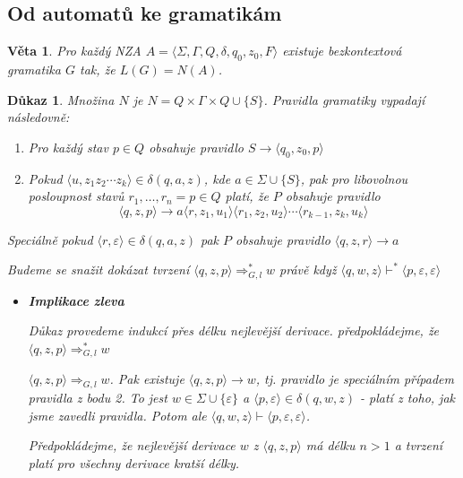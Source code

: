 \documentclass[10pt, a4paper, titlepage]{article}
\theoremstyle{note}
\newtheorem{veta}{Věta}
\newtheorem{dukaz}{Důkaz}
\begin{document}
\subsection{Od automatů ke gramatikám}

\begin{veta}
Pro každý NZA $A=\langle \Sigma,\Gamma,Q,\delta,q_0,z_0,F \rangle$ existuje bezkontextová gramatika $G$ tak, že $L(G)=N(A)$.
\end{veta}

\begin{dukaz}
Množina $N$ je $N=Q \times \Gamma \times Q \cup \lbrace S \rbrace$.
Pravidla gramatiky vypadají následovně:
\begin{enumerate}
\item
Pro každý stav $p \in Q$ obsahuje pravidlo $S \rightarrow \langle q_0,z_0,p \rangle$
\item
Pokud $\langle u,z_1z_2\cdots z_k \rangle \in \delta(q,a,z)$, kde $a \in \Sigma \cup \lbrace S \rbrace$, pak pro
libovolnou posloupnost stavů $r_1,\ldots,r_n=p \in Q$ platí, že $P$ obsahuje pravidlo
$$\langle q,z,p \rangle \rightarrow a\langle r,z_1,u_1 \rangle\langle r_1,z_2,u_2 \rangle \cdots \langle r_{k-1},z_k,u_k \rangle$$
\end{enumerate}

Speciálně pokud $\langle r, \varepsilon \rangle \in \delta(q,a,z)$ pak $P$ obsahuje pravidlo $\langle q,z,r \rangle \rightarrow a$

Budeme se snažit dokázat tvrzení $\langle q,z,p \rangle \Rightarrow_{G,l}^* w$ právě když $\langle q,w,z \rangle \vdash^* \langle p,\varepsilon ,\varepsilon   \rangle$

\begin{itemize}
\item
\textbf{Implikace zleva}

Důkaz provedeme indukcí přes délku nejlevější derivace. předpokládejme, že $\langle q,z,p \rangle \Rightarrow_{G,l}^* w$

$\langle q,z,p \rangle \Rightarrow_{G,l} w$. Pak existuje $\langle q,z,p \rangle \rightarrow w$, tj. pravidlo je speciálním případem pravidla z bodu 2. To jest $w \in \Sigma \cup \lbrace \varepsilon \rbrace$ a $\langle p, \varepsilon \rangle \in \delta (q,w,z)$ - platí z toho, jak jsme zavedli pravidla. Potom ale $\langle q,w,z \rangle \vdash \langle p,\varepsilon,\varepsilon \rangle$.

Předpokládejme, že nejlevější derivace $w$ z $\langle q,z,p \rangle$ má délku $n > 1$ a tvrzení platí pro všechny derivace kratší délky.


\end{itemize}
\end{dukaz}
\end{document}
